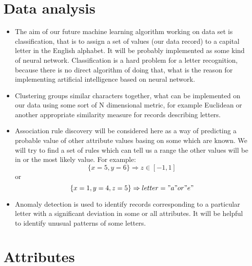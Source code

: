 \section*{Data analysis}
\begin{itemize}
\item The aim of our future machine learning algorithm working on data set is
classification, that is to assign a set of values (our data record) to a
capital letter in the English alphabet. It will be probably implemented as
some kind of neural network. Classification is a hard problem for a letter
recognition, because there is no direct algorithm of doing that, what is the
reason for implementing artificial intelligence based on neural network.
\item Clustering groups similar characters together, what can be implemented on
our data using some sort of N dimensional metric, for example Euclidean or
another appropriate similarity measure for records describing letters.
\item Association rule discovery will be considered here as a way of predicting
a probable value of other attribute values basing on some which are known.
We will try to find a set of rules which can tell us a range the other values
will be in or the most likely value. For example:
$$
\{ x = 5, y = 6 \} \Rightarrow z \in [-1,1]
$$
or
$$
\{ x = 1, y = 4, z = 5 \} \Rightarrow letter = "a" or "e"
$$
\item Anomaly detection is used to identify records corresponding to a particular
letter with a significant deviation in some or all attributes. It will be helpful
to identify unusual patterns of some letters.
\end{itemize}

\section*{Attributes}


